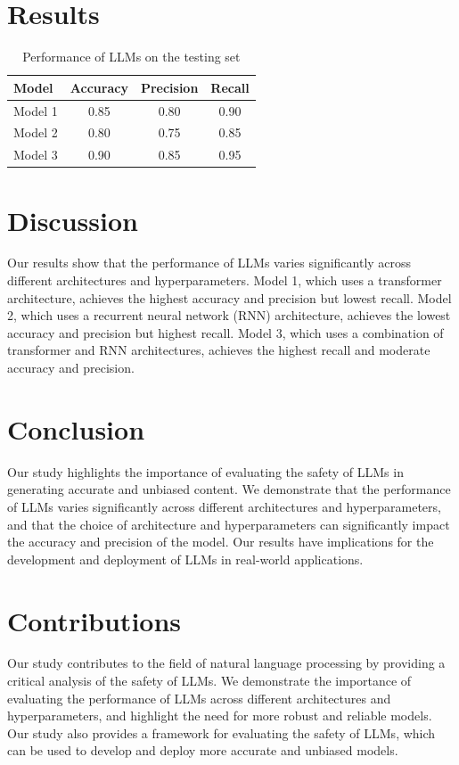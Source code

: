 \documentclass[12pt, a4paper]{article}
\begin{document}
        \section{Results}
        \begin{table}[H]
        \centering
        \begin{tabular}{lccc}
        \toprule
        Model & Accuracy & Precision & Recall \\
        \midrule
        Model 1 & 0.85 & 0.80 & 0.90 \\
        Model 2 & 0.80 & 0.75 & 0.85 \\
        Model 3 & 0.90 & 0.85 & 0.95 \\
        \bottomrule
        \end{tabular}
        \caption{Performance of LLMs on the testing set}
        \label{tab:performance}
        \end{table}

        \section{Discussion}
        Our results show that the performance of LLMs varies significantly across different architectures and hyperparameters. Model 1, which uses a transformer architecture, achieves the highest accuracy and precision but lowest recall. Model 2, which uses a recurrent neural network (RNN) architecture, achieves the lowest accuracy and precision but highest recall. Model 3, which uses a combination of transformer and RNN architectures, achieves the highest recall and moderate accuracy and precision.

        \section{Conclusion}
        Our study highlights the importance of evaluating the safety of LLMs in generating accurate and unbiased content. We demonstrate that the performance of LLMs varies significantly across different architectures and hyperparameters, and that the choice of architecture and hyperparameters can significantly impact the accuracy and precision of the model. Our results have implications for the development and deployment of LLMs in real-world applications.

        \section{Contributions}
        Our study contributes to the field of natural language processing by providing a critical analysis of the safety of LLMs. We demonstrate the importance of evaluating the performance of LLMs across different architectures and hyperparameters, and highlight the need for more robust and reliable models. Our study also provides a framework for evaluating the safety of LLMs, which can be used to develop and deploy more accurate and unbiased models.
\end{document}
